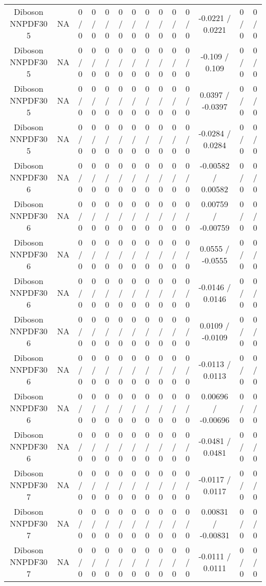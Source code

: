 \documentclass[10pt]{article}
\begin{document}
\begin{table}[htbp]
\begin{center}
\begin{tabular}{|c|c|c|c|c|c|c|c|c|c|c|c|c|c|}
  Diboson NNPDF30 5 &    NA    & 0 / 0 & 0 / 0 & 0 / 0 & 0 / 0 & 0 / 0 & 0 / 0 & 0 / 0 & 0 / 0 & 0 / 0 & -0.0221 / 0.0221 & 0 / 0 & 0 / 0 \\ 
  Diboson NNPDF30 5 &    NA    & 0 / 0 & 0 / 0 & 0 / 0 & 0 / 0 & 0 / 0 & 0 / 0 & 0 / 0 & 0 / 0 & 0 / 0 & -0.109 / 0.109 & 0 / 0 & 0 / 0 \\ 
  Diboson NNPDF30 5 &    NA    & 0 / 0 & 0 / 0 & 0 / 0 & 0 / 0 & 0 / 0 & 0 / 0 & 0 / 0 & 0 / 0 & 0 / 0 & 0.0397 / -0.0397 & 0 / 0 & 0 / 0 \\ 
  Diboson NNPDF30 5 &    NA    & 0 / 0 & 0 / 0 & 0 / 0 & 0 / 0 & 0 / 0 & 0 / 0 & 0 / 0 & 0 / 0 & 0 / 0 & -0.0284 / 0.0284 & 0 / 0 & 0 / 0 \\ 
  Diboson NNPDF30 6 &    NA    & 0 / 0 & 0 / 0 & 0 / 0 & 0 / 0 & 0 / 0 & 0 / 0 & 0 / 0 & 0 / 0 & 0 / 0 & -0.00582 / 0.00582 & 0 / 0 & 0 / 0 \\ 
  Diboson NNPDF30 6 &    NA    & 0 / 0 & 0 / 0 & 0 / 0 & 0 / 0 & 0 / 0 & 0 / 0 & 0 / 0 & 0 / 0 & 0 / 0 & 0.00759 / -0.00759 & 0 / 0 & 0 / 0 \\ 
  Diboson NNPDF30 6 &    NA    & 0 / 0 & 0 / 0 & 0 / 0 & 0 / 0 & 0 / 0 & 0 / 0 & 0 / 0 & 0 / 0 & 0 / 0 & 0.0555 / -0.0555 & 0 / 0 & 0 / 0 \\ 
  Diboson NNPDF30 6 &    NA    & 0 / 0 & 0 / 0 & 0 / 0 & 0 / 0 & 0 / 0 & 0 / 0 & 0 / 0 & 0 / 0 & 0 / 0 & -0.0146 / 0.0146 & 0 / 0 & 0 / 0 \\ 
  Diboson NNPDF30 6 &    NA    & 0 / 0 & 0 / 0 & 0 / 0 & 0 / 0 & 0 / 0 & 0 / 0 & 0 / 0 & 0 / 0 & 0 / 0 & 0.0109 / -0.0109 & 0 / 0 & 0 / 0 \\ 
  Diboson NNPDF30 6 &    NA    & 0 / 0 & 0 / 0 & 0 / 0 & 0 / 0 & 0 / 0 & 0 / 0 & 0 / 0 & 0 / 0 & 0 / 0 & -0.0113 / 0.0113 & 0 / 0 & 0 / 0 \\ 
  Diboson NNPDF30 6 &    NA    & 0 / 0 & 0 / 0 & 0 / 0 & 0 / 0 & 0 / 0 & 0 / 0 & 0 / 0 & 0 / 0 & 0 / 0 & 0.00696 / -0.00696 & 0 / 0 & 0 / 0 \\ 
  Diboson NNPDF30 6 &    NA    & 0 / 0 & 0 / 0 & 0 / 0 & 0 / 0 & 0 / 0 & 0 / 0 & 0 / 0 & 0 / 0 & 0 / 0 & -0.0481 / 0.0481 & 0 / 0 & 0 / 0 \\ 
  Diboson NNPDF30 7 &    NA    & 0 / 0 & 0 / 0 & 0 / 0 & 0 / 0 & 0 / 0 & 0 / 0 & 0 / 0 & 0 / 0 & 0 / 0 & -0.0117 / 0.0117 & 0 / 0 & 0 / 0 \\ 
  Diboson NNPDF30 7 &    NA    & 0 / 0 & 0 / 0 & 0 / 0 & 0 / 0 & 0 / 0 & 0 / 0 & 0 / 0 & 0 / 0 & 0 / 0 & 0.00831 / -0.00831 & 0 / 0 & 0 / 0 \\ 
  Diboson NNPDF30 7 &    NA    & 0 / 0 & 0 / 0 & 0 / 0 & 0 / 0 & 0 / 0 & 0 / 0 & 0 / 0 & 0 / 0 & 0 / 0 & -0.0111 / 0.0111 & 0 / 0 & 0 / 0 \\ 

\end{tabular}
\end{center}
\end{table}
\end{document}
